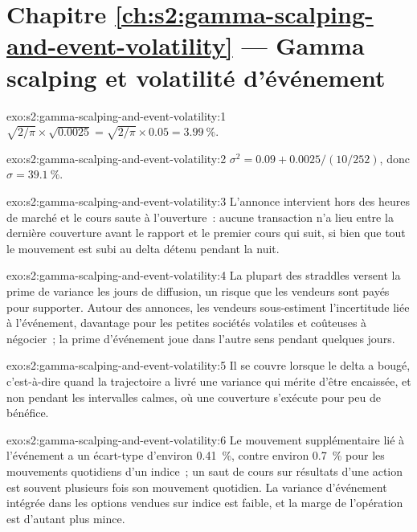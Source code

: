 \section*{Chapitre \ref{ch:s2:gamma-scalping-and-event-volatility} --- Gamma scalping et volatilité d'événement}

\begin{solution}{exo:s2:gamma-scalping-and-event-volatility:1}
$\sqrt{2/\pi}\times\sqrt{0.0025} = \sqrt{2/\pi}\times 0.05 = 3.99~\%$.
\end{solution}

\begin{solution}{exo:s2:gamma-scalping-and-event-volatility:2}
$\sigma^2 = 0.09 + 0.0025/(10/252)$, donc $\sigma = 39.1~\%$.
\end{solution}

\begin{solution}{exo:s2:gamma-scalping-and-event-volatility:3}
L'annonce intervient hors des heures de marché et le cours saute à l'ouverture~: aucune transaction n'a lieu entre la dernière couverture avant le rapport et le
premier cours qui suit, si bien que tout le mouvement est subi au delta détenu pendant la nuit.
\end{solution}

\begin{solution}{exo:s2:gamma-scalping-and-event-volatility:4}
La plupart des straddles versent la prime de variance les jours de diffusion, un risque que les vendeurs sont payés pour supporter. Autour des annonces, les vendeurs sous-estiment l'incertitude liée
à l'événement, davantage pour les petites sociétés volatiles et coûteuses à négocier~; la prime d'événement joue dans l'autre sens pendant quelques jours.
\end{solution}

\begin{solution}{exo:s2:gamma-scalping-and-event-volatility:5}
Il se couvre lorsque le delta a bougé, c'est-à-dire quand la trajectoire a livré une variance qui mérite d'être encaissée, et non
pendant les intervalles calmes, où une couverture s'exécute pour peu de bénéfice.
\end{solution}

\begin{solution}{exo:s2:gamma-scalping-and-event-volatility:6}
Le mouvement supplémentaire lié à l'événement a un écart-type d'environ 0.41~\%, contre environ 0.7~\% pour les mouvements quotidiens d'un indice~; un saut de cours sur résultats d'une action est souvent
plusieurs fois son mouvement quotidien. La variance d'événement intégrée dans les options vendues sur indice est faible, et la marge de l'opération est d'autant plus mince.
\end{solution}

